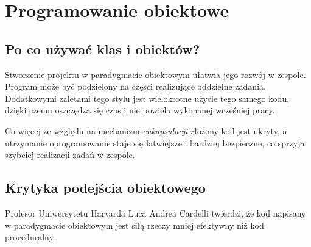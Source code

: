 \newpage

\section{Programowanie obiektowe}

\subsection{Po co używać klas i obiektów?}

\begin{flushleft}
    Stworzenie projektu w paradygmacie obiektowym ułatwia jego rozwój w zespole. \cite{oop-benefits} Program może być podzielony na części realizujące oddzielne zadania.  Dodatkowymi zaletami tego stylu jest wielokrotne użycie tego samego kodu, dzięki czemu oszczędza się czas i nie powiela wykonanej wcześniej pracy.
 \end{flushleft}
 
\begin{flushleft}
    Co więcej ze względu na mechanizm \emph{enkapsulacji} złożony kod jest ukryty, a utrzymanie oprogramowanie staje się łatwiejsze i bardziej bezpieczne, co sprzyja szybciej realizacji zadań w zespole.
\end{flushleft} 

\subsection{Krytyka podejścia obiektowego}

\begin{flushleft}
    Profesor Uniwersytetu Harvarda Luca Andrea Cardelli twierdzi, że kod \linebreak napisany w paradygmacie obiektowym jest siłą rzeczy mniej efektywny niż kod proceduralny. \cite{oop-critics} 
\end{flushleft}
